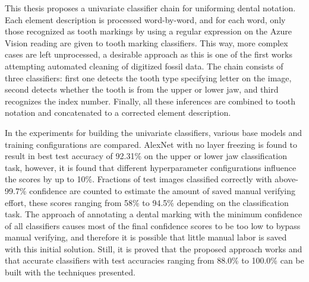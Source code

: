 \documentclass[english,twoside,openright]{UH_DS_MSc}
\begin{document}
This thesis proposes a univariate classifier chain for
uniforming dental notation. Each element description is processed 
word-by-word, and for each word, only those recognized as tooth markings
by using a regular expression on the Azure Vision reading are given to tooth marking
classifiers. This way, more complex cases are left unprocessed, a desirable
approach as this is one of the first works attempting automated cleaning 
of digitized fossil data. The chain consists of three classifiers: first one detects the tooth type specifying letter on the image, second detects whether the tooth is from the upper or lower jaw,
and third recognizes the index number. Finally, all these inferences are combined to tooth notation and concatenated to a corrected element 
description. 

In the experiments for building the univariate classifiers, various base models and training configurations are compared.
AlexNet with no layer freezing is found to result in best test accuracy of 92.31\% on the 
upper or lower jaw classification task, however, it is found that different hyperparameter 
configurations influence the scores by up to 10\%. 
Fractions of test images classified correctly with above-99.7\% confidence are 
counted to estimate the amount of saved manual verifying effort, these scores ranging 
from 58\% to 94.5\% depending on the classification task.
The approach of annotating a dental marking with the minimum 
confidence of all classifiers causes most of the final confidence scores 
to be too low to bypass manual verifying, and therefore it is possible that little manual labor is 
saved with this initial solution. Still, it is proved that the proposed approach works and that 
accurate classifiers with test accuracies ranging from 88.0\% to 100.0\% can be built 
with the techniques presented.

\end{document}
